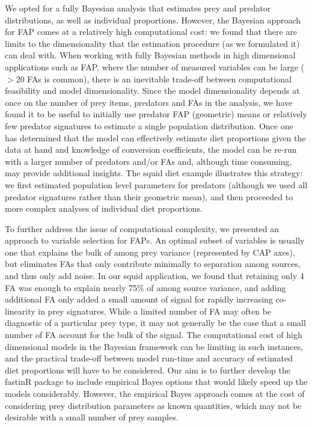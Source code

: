 \documentclass{article}%
\begin{document}
\begin{spacing}{1.9}
\begin{flushleft}
We opted for a fully Bayesian analysis that estimates prey and predator
distributions, as well as individual proportions. However, the Bayesian
approach for FAP comes at a relatively
high computational cost: we found that there are limits to the dimensionality
that the estimation procedure (as we formulated it) can deal with. When working with
fully Bayesian methods in high dimensional applications such as FAP,
where the number of measured variables can be large ($>$20 FAs is common), there
is an inevitable trade-off between computational feasibility and
model dimensionality. Since the model dimensionality depends at once on the number of prey items, predators and
FAs in the analysis, we have found it to be useful to
initially use
predator FAP (geometric) means or relatively few predator signatures to
estimate a single population distribution. Once one has determined
that the model can effectively estimate diet proportions given the
data at hand and knowledge of conversion coefficients, the model can
be re-run with a larger number of predators and/or FAs and, although time consuming, may provide additional
insights. The squid diet example illustrates this strategy: we first
estimated population level parameters for predators (although we used
all predator signatures rather than their geometric mean), and then
proceeded to more complex analyses of individual diet proportions.

To further address the issue of computational complexity, we presented
an approach to variable selection for FAPs. An optimal subset of
variables is usually one that explains the bulk of among prey variance
(represented by CAP axes), but eliminates FAs that only contribute
minimally to separation among sources, and thus only add noise. In our
squid application, we found that retaining only 4 FA was enough to
explain nearly 75\% of among source variance, and adding additional FA
only added a small amount of signal for rapidly increasing
co-linearity in prey signatures. While a limited number of FA may
often be diagnostic of a particular prey type, it may not generally be
the case that a small number of FA account for the bulk of the
signal. The computational cost of high dimensional models in the
Bayesian framework can be limiting in such instances, and the
practical trade-off between model run-time and accuracy of estimated
diet proportions will have to be considered. Our aim is to further
develop the fastinR package to include empirical Bayes options \citep[as
described in][]{parnell_bayesian_2012} that would likely speed up
the models considerably. However, the empirical Bayes approach comes at the cost of considering prey
distribution parameters as known quantities, which may not be desirable with a
small number of prey samples.


\end{flushleft}
\end{spacing}
\end{document}
